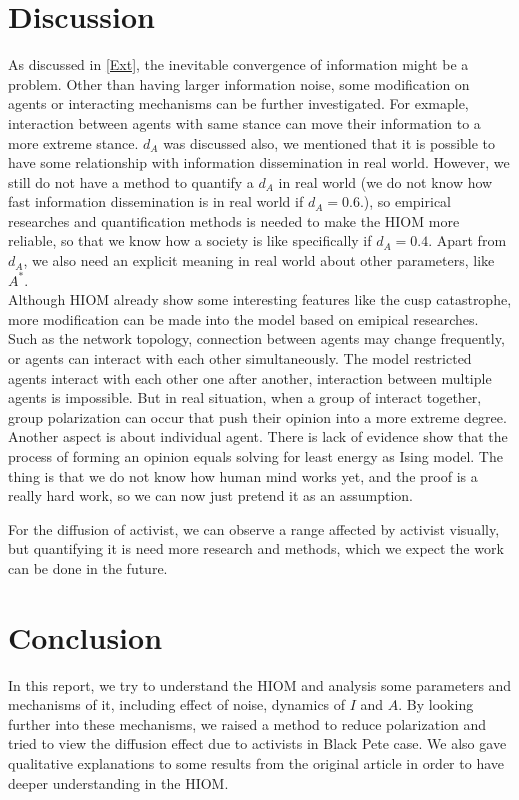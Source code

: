 \documentclass{article}
\begin{document}
\section{Discussion}
As discussed in \autoref{Ext}, the inevitable convergence of information might be a problem. Other than having larger information noise, some modification on agents or interacting mechanisms can be further investigated. For exmaple, interaction between agents
with same stance can move their information to a more extreme stance. $d_A$ was discussed also, we mentioned that it is possible to have some relationship with information dissemination in real world. However, we still do not have a method to quantify a $d_A$ in real world (we do not know how fast information dissemination is in real world if $d_A=0.6$.), so empirical researches and quantification methods is needed
to make the HIOM more reliable, so that we know how a society is like specifically if $d_A=0.4$. Apart from $d_A$, we also need an explicit meaning in real world about other parameters, like $A^*$.\\

Although HIOM already show some interesting features like the cusp catastrophe, more modification can be made into the model based on emipical researches. Such as the network topology, connection between agents may change frequently, or agents can interact with each other simultaneously. The model restricted agents interact with each other one after another, interaction between multiple agents is impossible.
But in real situation, when a group of interact together, group polarization can occur that push their opinion into a more extreme degree\cite{moscovici1969group}. Another aspect is about individual agent. There is lack of evidence show that the process of forming an opinion equals solving for least energy as Ising model.
The thing is that we do not know how human mind works yet, and the proof is a really hard work, so we can now just pretend it as an assumption.

For the diffusion of activist, we can observe a range affected by activist visually, but quantifying it is need more research and methods, which we expect the work can be done in the future.

\section{Conclusion}
In this report, we try to understand the HIOM and analysis some parameters and mechanisms of it, including effect of noise, dynamics of $I$ and $A$. By looking further into these mechanisms, we raised a method to reduce polarization and tried to view the diffusion effect due to activists in Black Pete case. We also gave qualitative explanations to some results from the original article in order to have
deeper understanding in the HIOM.



\end{document}
